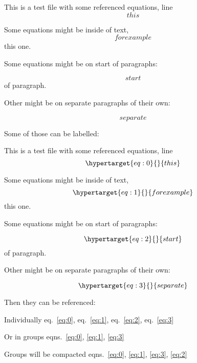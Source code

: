 This is a test file with some referenced equations, line
\begin{equation}{ this }\end{equation}

Some equations might be inside of text,
\begin{equation}{ for example }\end{equation} this one.

Some equations might be on start of paragraphs:

\begin{equation}{ start }\end{equation} of paragraph.

Other might be on separate paragraphs of their own:

\begin{equation}{ separate }\end{equation}

Some of those can be labelled:

This is a test file with some referenced equations, line
\begin{equation}\protect\hypertarget{eq:0}{}{ this }\label{eq:0}\end{equation}

Some equations might be inside of text,
\begin{equation}\protect\hypertarget{eq:1}{}{ for example }\label{eq:1}\end{equation}
this one.

Some equations might be on start of paragraphs:

\begin{equation}\protect\hypertarget{eq:2}{}{ start }\label{eq:2}\end{equation}
of paragraph.

Other might be on separate paragraphs of their own:

\begin{equation}\protect\hypertarget{eq:3}{}{ separate }\label{eq:3}\end{equation}

Then they can be referenced:

Individually eq.~\ref{eq:0}, eq.~\ref{eq:1}, eq.~\ref{eq:2},
eq.~\ref{eq:3}

Or in groups eqns.~\ref{eq:0}, \ref{eq:1}, \ref{eq:3}

Groups will be compacted
eqns.~\ref{eq:0}, \ref{eq:1}, \ref{eq:3}, \ref{eq:2}
